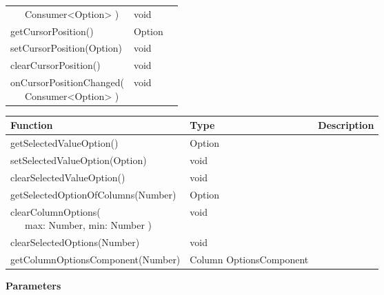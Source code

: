 \begin{table}[!htb]
\begin{tabular}{ p{5cm} p{3cm} p{5cm} }
{                \ \ \ Consumer<Option>
            )}                               & void                   &  \\
        getCursorPosition()                  & Option                 &  \\
        setCursorPosition(Option)            & void                   &  \\
        clearCursorPosition()                & void                   &  \\
        \tbbr{
            onCursorPositionChanged( \\
                \ \ \ Consumer<Option>
            )}                               & void                   &  \\
        \bottomrule[0.5pt]
    \end{tabular}
\end{table}

\clearpage
\begin{table}[!htb] 
    \label{api:selectControllerReturn2}
    \scriptsize
    \setlength\extrarowheight{4pt}
    \begin{tabular}{ p{5cm} p{2.3cm} p{5.7cm} }
        \toprule[0.5pt]
        \textbf{Function}                    & \textbf{Type}          & \textbf{Description} \\
        \midrule    
        getSelectedValueOption()             & Option                 &  \\
        setSelectedValueOption(Option)       & void                   &  \\
        clearSelectedValueOption()           & void                   &  \\
        getSelectedOptionOfColumns(Number)   & Option                 &  \\
        \tbbr{
            clearColumnOptions( \\
                \ \ \ max: Number, min: Number 
            )}                               & void                   &  \\
        clearSelectedOptions(Number)         & void                   &  \\
        getColumnOptionsComponent(Number)    & \raggedright Column\-
                                               Options\-Component     &  \\
        \bottomrule[1.2pt]
    \end{tabular}
\end{table}

\vspace*{6pt}
\noindent
\textbf{Parameters}

